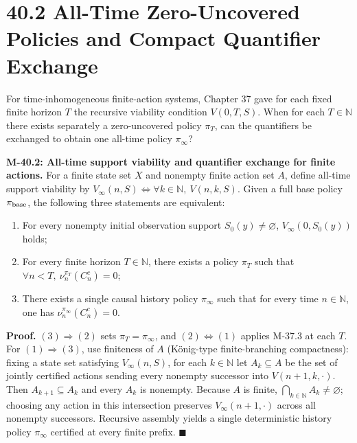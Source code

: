 \documentclass[
  english,
  11pt,
  oneside]{book}
\newcounter{none} %
\providecommand{\tightlist}{%
  \setlength{\itemsep}{0pt}\setlength{\parskip}{0pt}}
\begin{document}
\section{40.2 All-Time Zero-Uncovered Policies and Compact Quantifier Exchange}\label{all-time-zero-uncovered-policies-and-compact-quantifier-exchange}

For time-inhomogeneous finite-action systems, Chapter 37 gave for each fixed finite horizon \(T\) the recursive viability condition \(V(0,T,S)\). When for each \(T\in\mathbb N\) there exists separately a zero-uncovered policy \(\pi_T\), can the quantifiers be exchanged to obtain one all-time policy \(\pi_\infty\)?

\hypertarget{m-40-2}{}\label{m-40-2}

\textbf{M-40.2: All-time support viability and quantifier exchange for finite actions.} For a finite state set \(X\) and nonempty finite action set \(A\), define all-time support viability by \(V_\infty(n,S)\iff\forall k\in\mathbb N,\ V(n,k,S)\). Given a full base policy \(\pi_{\rm base}\), the following three statements are equivalent:

\begin{enumerate}
\def\labelenumi{\arabic{enumi}.}
\tightlist
\item
  For every nonempty initial observation support \(S_0(y)\neq\varnothing\), \(V_\infty(0,S_0(y))\) holds;
\item
  For every finite horizon \(T\in\mathbb N\), there exists a policy \(\pi_T\) such that \(\forall n<T,\ \nu_n^{\pi_T}(C_n^c)=0\);
\item
  There exists a single causal history policy \(\pi_\infty\) such that for every time \(n\in\mathbb N\), one has \(\nu_n^{\pi_\infty}(C_n^c)=0\).
\end{enumerate}

\textbf{Proof.} \((3)\Rightarrow(2)\) sets \(\pi_T=\pi_\infty\), and \((2)\Leftrightarrow(1)\) applies M-37.3 at each \(T\). For \((1)\Rightarrow(3)\), use finiteness of \(A\) (König-type finite-branching compactness): fixing a state set satisfying \(V_\infty(n,S)\), for each \(k\in\mathbb N\) let \(A_k\subseteq A\) be the set of jointly certified actions sending every nonempty successor into \(V(n+1,k,\cdot)\). Then \(A_{k+1}\subseteq A_k\) and every \(A_k\) is nonempty. Because \(A\) is finite, \(\bigcap_{k\in\mathbb N}A_k\neq\varnothing\); choosing any action in this intersection preserves \(V_\infty(n+1,\cdot)\) across all nonempty successors. Recursive assembly yields a single deterministic history policy \(\pi_\infty\) certified at every finite prefix. \(\blacksquare\)
\end{document}
